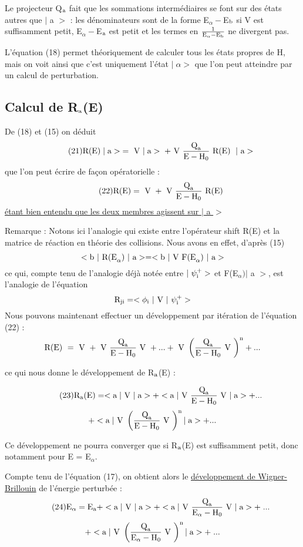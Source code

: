 Le projecteur Q$_{\text{a}}$ fait que les sommations intermédiaires se font sur
des états autres que $|$ a $>$ : les dénominateurs sont de la forme E$_\alpha-$E$_{\text{b}}$ si
V est suffisamment petit, E$_\alpha-$E$_{\text{a}}$ est petit et les termes en 
$\frac{1}{\text{E}_\alpha-\text{E}_{\text{b}}}$ ne
divergent pas.

L'équation (18) permet théoriquement de calculer tous les états propres de H,
mais on voit ainsi que c'est uniquement l'état $|\;\alpha>$ que l'on peut
atteindre par un calcul de perturbation.
\subsection{Calcul de R$_{\text{a}}$(E)}%
De (18) et (15) on déduit
\[
\tag{21}\text{R(E)}\;|\;\text{a}>\;=\text{ V }|\;\text{a}>\;+\text{ V }
\frac{\text{Q}_{\text{a}}}{\text{E}-\text{H}_0}\text{ R(E) }\;|\text{ a}>
\]
que l'on peut écrire de façon opératorielle :
\[
\tag{22}\text{R(E)}=\text{ V }+\text{ V }
\frac{\text{Q}_{\text{a}}}{\text{E}-\text{H}_0}\text{ R(E)}
\]
\ul{étant bien entendu que les deux membres agissent sur $|$ a $>$}

Remarque : Notons ici l'analogie qui existe entre l'opérateur shift R(E) et la
matrice de réaction en théorie des collisions.
Nous avons en effet, d'après (15)
\[
<\text{b }|\text{ R(E}_\alpha)\ |\text{ a}>=<\text{b }|\text{ V F(E}_\alpha)\ |\text{ a}>
\]
ce qui, compte tenu de l'analogie déjà notée entre $|\ \psi_{\text{i}}^+>$ et  F(E$_\alpha)|$ a $>$,
est l'analogie de l'équation
\[
\mt{R}_\mt{ji}=<\phi_\mt{i}\ |\mt{ V }|\ \psi_\mt{i}^+>
\]
Nous pouvons maintenant effectuer un développement par itération de l'équation (22) :
\[
\text{R(E) }=\text{ V }+\text{ V }\frac{\text{Q}_{\text{a}}}{\text{E}-\text{H}_0}\text{ V }+...+
\text{ V }\left(\frac{\text{Q}_{\text{a}}}{\text{E}-\text{H}_0}\text{ V }\right)^{\text{n}}+...
\]

ce qui nous donne le développement de R$_{\text{a}}$(E) :

\[
\tag{23}\text{R}_{\text{a}}(\text{E})=<\text{a}\;|\text{ V }|\;\text{a}>+<\text{a}\;|\text{ V }
\frac{\text{Q}_{\text{a}}}{\text{E}-\text{H}_0}\text{ V }|\;\text{a}>+...
\]
\[
+<\text{a}\;|\text{ V }\left(\frac{\text{Q}_{\text{a}}}{\text{E}-\text{H}_0}\text{ V }\right)^{\text{n}}|\;\text{a}>+...
\]

Ce développement ne pourra converger que si R$_{\text{a}}$(E) est suffisamment petit, donc
notamment pour E = E$_\alpha$.

Compte tenu de l'équation (17), on obtient alors le \ul{développement de
Wigner-Brillouin} de l'énergie perturbée :
\[
\tag{24}\text{E}_\alpha=\text{E}_{\text{a}}+<\text{a}\;|\text{ V }|\;\text{a}>+<\text{a}\;|\text{ V }
\frac{\text{Q}_{\text{a}}}{\text{E}_\alpha-\text{H}_0}\text{ V }|\;\text{a}>+\;...
\]
\[
+<\text{a}\;|\text{ V }\left(\frac{\text{Q}_{\text{a}}}{\text{E}_\alpha-\text{H}_0}\text{ V }\right)^{\text{n}}|\;\text{a}>+\;...
\]

